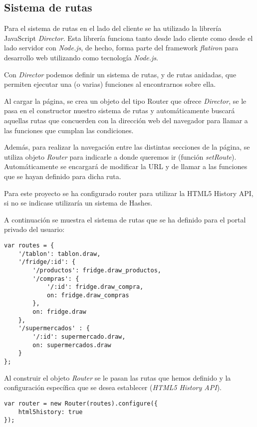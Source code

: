\subsection{Sistema de rutas}

Para el sistema de rutas en el lado del cliente se ha utilizado la librería JavaScript \emph{Director}. Esta librería funciona tanto desde lado cliente como desde el lado servidor con \emph{Node.js}, de hecho, forma parte del framework \emph{flatiron} para desarrollo web utilizando como tecnología \emph{Node.js}.

Con \emph{Director} podemos definir un sistema de rutas, y de rutas anidadas, que permiten ejecutar una (o varias) funciones al encontrarnos sobre ella.

Al cargar la página, se crea un objeto del tipo Router que ofrece \emph{Director}, se le pasa en el constructor nuestro sistema de rutas y automáticamente buscará aquellas rutas que concuerden con la dirección web del navegador para llamar a las funciones que cumplan las condiciones.

Además, para realizar la navegación entre las distintas secciones de la página, se utiliza objeto \emph{Router} para indicarle a donde queremos ir (función \emph{setRoute}). Automáticamente se encargará de modificar la URL y de llamar a las funciones que se hayan definido para dicha ruta.

Para este proyecto se ha configurado router para utilizar la HTML5 History API, si no se indicase utilizaría un sistema de Hashes.

A continuación se muestra el sistema de rutas que se ha definido para el portal privado del usuario:

    \begin{lstlisting}
var routes = {
    '/tablon': tablon.draw,
    '/fridge/:id': {
        '/productos': fridge.draw_productos,
        '/compras': {
            '/:id': fridge.draw_compra,
            on: fridge.draw_compras
        },
        on: fridge.draw
    },
    '/supermercados' : {
        '/:id': supermercado.draw,
        on: supermercados.draw
    }
};
    \end{lstlisting}

Al construir el objeto \emph{Router} se le pasan las rutas que hemos definido y la configuración específica que se desea establecer (\emph{HTML5 History API}).

    \begin{lstlisting}
var router = new Router(routes).configure({
    html5history: true
});
    \end{lstlisting}

